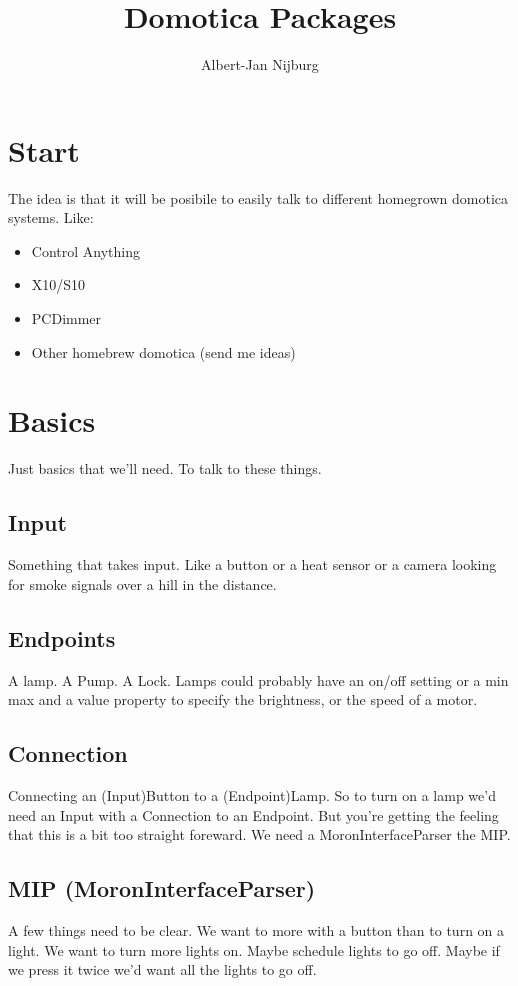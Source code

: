 \documentclass[a4paper]{article}
\author{Albert-Jan Nijburg}
\title{Domotica Packages}
\begin{document}
\maketitle
\section{Start}
The idea is that it will be posibile to easily talk to different homegrown domotica systems. Like:
\begin{itemize}
\item Control Anything
\item X10/S10
\item PCDimmer
\item Other homebrew domotica (send me ideas)
\end{itemize}
\section{Basics}
Just basics that we'll need. To talk to these things. 

\subsection{Input}
Something that takes input. Like a button or a heat sensor or a camera looking for smoke signals over a hill in the distance.

\subsection{Endpoints}
A lamp. A Pump. A Lock. Lamps could probably have an on/off setting or a min max and a value property to specify the brightness, or the speed of a motor. 

\subsection{Connection}
Connecting an (Input)Button to a (Endpoint)Lamp. So to turn on a lamp we'd need an Input with a Connection to an Endpoint. But you're getting the feeling that this is a bit too straight foreward. We need a MoronInterfaceParser the MIP. 

\subsection{MIP (MoronInterfaceParser)}
A few things need to be clear. We want to more with a button than to turn on a light. We want to turn more lights on. Maybe schedule lights to go off. Maybe if we press it twice we'd want all the lights to go off. 
\end{document}
